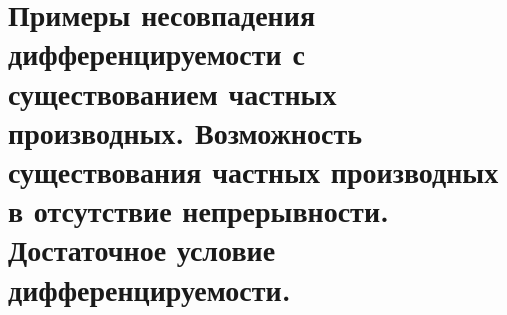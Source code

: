 \documentclass[../main.tex]{subfiles}
\begin{document}
\newpage
\section{Примеры несовпадения дифференцируемости с существованием частных производных. Возможность существования частных производных в отсутствие непрерывности. Достаточное условие дифференцируемости.}
\end{document}
